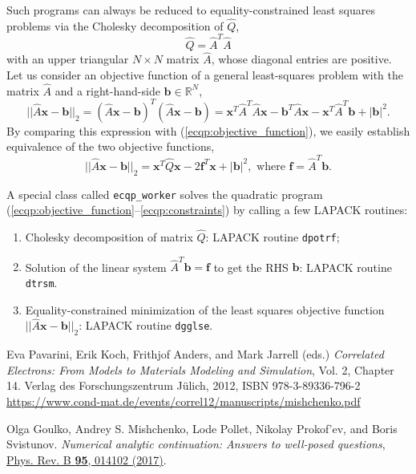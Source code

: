 \documentclass[]{article}
\begin{document}
Such programs can always be reduced to equality-constrained least squares problems via the Cholesky decomposition of $\hat Q$,
\begin{equation}
    \hat Q = \hat A^T \hat A
\end{equation}
with an upper triangular $N\times N$ matrix $\hat A$, whose diagonal entries are positive. Let us consider an objective function of a general least-squares problem with the matrix $\hat A$ and a right-hand-side $\mathbf{b}\in \mathbb{R}^N$,
\begin{equation}
    ||\hat A\mathbf{x} - \mathbf{b}||_2 =
    (\hat A\mathbf{x} - \mathbf{b})^T (\hat A\mathbf{x} - \mathbf{b}) =
    \mathbf{x}^T \hat A^T \hat A \mathbf{x} -
    \mathbf{b}^T \hat A\mathbf{x} - \mathbf{x}^T \hat A^T\mathbf{b}
    + |\mathbf{b}|^2.
\end{equation}
By comparing this expression with (\ref{ecqp:objective_function}), we easily establish equivalence of the two objective functions,
\begin{equation}
    ||\hat A\mathbf{x} - \mathbf{b}||_2 =
    \mathbf{x}^T \hat Q \mathbf{x} - 2\mathbf{f}^T\mathbf{x} + |\mathbf{b}|^2,
    \textrm{ where } \mathbf{f} = \hat A^T\mathbf{b}.
\end{equation}

A special class called \verb|ecqp_worker| solves the quadratic program
(\ref{ecqp:objective_function}--\ref{ecqp:constraints}) by calling a few LAPACK routines:
\begin{enumerate}
    \item Cholesky decomposition of matrix $\hat Q$: LAPACK routine \verb|dpotrf|;

    \item Solution of the linear system $\hat A^T\mathbf{b} = \mathbf{f}$ to get the RHS $\mathbf{b}$: LAPACK routine \verb|dtrsm|.

    \item Equality-constrained minimization of the least squares objective function $||\hat A\mathbf{x} - \mathbf{b}||_2$: LAPACK routine \verb|dgglse|.
\end{enumerate}

\begin{thebibliography}{9}

Eva Pavarini, Erik Koch, Frithjof Anders, and Mark Jarrell (eds.)
{\it Correlated Electrons: From Models to Materials
Modeling and Simulation}, Vol. 2, Chapter 14.
Verlag des Forschungszentrum Jülich, 2012,
ISBN 978-3-89336-796-2
\url{https://www.cond-mat.de/events/correl12/manuscripts/mishchenko.pdf}

Olga Goulko, Andrey S. Mishchenko, Lode Pollet, Nikolay Prokof'ev, and Boris Svistunov.
{\it Numerical analytic continuation: Answers to well-posed questions},
\href{https://doi.org/10.1103/PhysRevB.95.014102}{Phys. Rev. B {\bf 95}, 014102 (2017)}.

\end{thebibliography}
\end{document}
